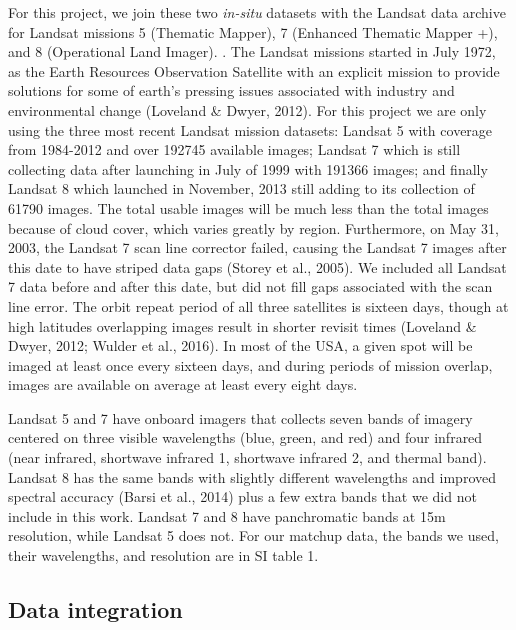 \documentclass[]{article}
\begin{document}
For this project, we join these two \emph{in-situ} datasets with the
Landsat data archive for Landsat missions 5 (Thematic Mapper), 7
(Enhanced Thematic Mapper +), and 8 (Operational Land Imager). . The
Landsat missions started in July 1972, as the Earth Resources
Observation Satellite with an explicit mission to provide solutions for
some of earth's pressing issues associated with industry and
environmental change (Loveland \& Dwyer, 2012). For this project we are
only using the three most recent Landsat mission datasets: Landsat 5
with coverage from 1984-2012 and over 192745 available images; Landsat 7
which is still collecting data after launching in July of 1999 with
191366 images; and finally Landsat 8 which launched in November, 2013
still adding to its collection of 61790 images. The total usable images
will be much less than the total images because of cloud cover, which
varies greatly by region. Furthermore, on May 31, 2003, the Landsat 7
scan line corrector failed, causing the Landsat 7 images after this date
to have striped data gaps (Storey et al., 2005). We included all Landsat
7 data before and after this date, but did not fill gaps associated with
the scan line error. The orbit repeat period of all three satellites is
sixteen days, though at high latitudes overlapping images result in
shorter revisit times (Loveland \& Dwyer, 2012; Wulder et al., 2016). In
most of the USA, a given spot will be imaged at least once every sixteen
days, and during periods of mission overlap, images are available on
average at least every eight days.

Landsat 5 and 7 have onboard imagers that collects seven bands of
imagery centered on three visible wavelengths (blue, green, and red) and
four infrared (near infrared, shortwave infrared 1, shortwave infrared
2, and thermal band). Landsat 8 has the same bands with slightly
different wavelengths and improved spectral accuracy (Barsi et al.,
2014) plus a few extra bands that we did not include in this work.
Landsat 7 and 8 have panchromatic bands at 15m resolution, while Landsat
5 does not. For our matchup data, the bands we used, their wavelengths,
and resolution are in SI table 1.

\hypertarget{data-integration}{%
\subsection{Data integration}\label{data-integration}}
\end{document}
